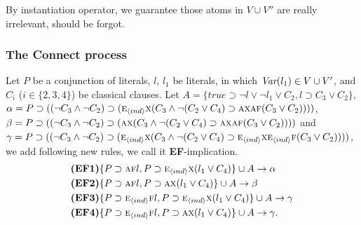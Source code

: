 \documentclass{article}
\begin{document}
By instantiation operator, we guarantee those atoms in $V\cup V''$ are really irrelevant, \ie should be forgot.


\subsubsection{The Connect process}
Let $P$ be a conjunction of literals, $l$, $l_1$ be literals,
in which $\textit{Var}(l_1)\in V \cup V'$,
and $C_i$ ($i\in \{2,3,4\}$) be classical clauses.
Let $A=\{true \supset \neg l \vee \neg l_1 \vee C_2, l \supset C_3\vee C_2\}$, $\alpha=P \supset ((\neg C_3 \wedge \neg C_2) \supset  (\textsc{e}_{{\langle{ind}\rangle}}\textsc{x}(C_3 \wedge \neg (C_2 \vee C_4) \supset \textsc{a}\textsc{x} \textsc{a}\textsc{f}(C_3 \vee C_2))))$, $\beta = P \supset ((\neg C_3 \wedge \neg C_2) \supset (\textsc{a}\textsc{x}(C_3 \wedge  \neg (C_2 \vee C_4) \supset \textsc{a}\textsc{x} \textsc{a}\textsc{f}(C_3 \vee C_2))))$ and $\gamma = P \supset ((\neg C_3 \wedge \neg C_2) \supset (\textsc{e}_{{\langle{ind}\rangle}}\textsc{x}(C_3 \wedge  \neg (C_2 \vee C_4) \supset \textsc{e}_{{\langle{ind}\rangle}}\textsc{x} \textsc{e}_{{\langle{ind}\rangle}}\textsc{f}(C_3 \vee C_2))))$, we add following new rules, we call it \textbf{EF}-implication.
\begin{align*}
& \textbf{(EF1)} \{P\supset \textsc{a}\textsc{f} l, P\supset \textsc{e}_{{\langle{ind}\rangle}}\textsc{x} (l_1 \vee C_4)\}\cup A \rightarrow \alpha \\
& \textbf{(EF2)} \{P\supset \textsc{a}\textsc{f} l, P\supset \textsc{a} \textsc{x} (l_1 \vee C_4)\}\cup A \rightarrow \beta \\
& \textbf{(EF3)} \{P\supset \textsc{e}_{{\langle{ind}\rangle}}\textsc{f} l, P\supset \textsc{e}_{{\langle{ind}\rangle}}\textsc{x} (l_1 \vee C_4)\}\cup A \rightarrow \gamma  \\
& \textbf{(EF4)} \{P\supset \textsc{e}_{{\langle{ind}\rangle}}\textsc{f} l, P\supset \textsc{a}\textsc{x} (l_1 \vee C_4)\}\cup A \rightarrow \gamma.
\end{align*}
\end{document}
